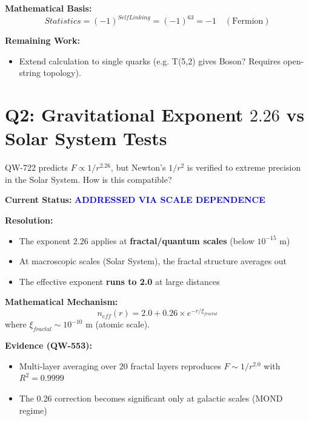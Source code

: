 \documentclass[11pt,a4paper]{book}
\theoremstyle{remark}
\begin{document}
\textbf{Mathematical Basis:}
\begin{equation}
Statistics = (-1)^{SelfLinking} = (-1)^{63} = -1 \quad (\text{Fermion})
\end{equation}

\textbf{Remaining Work:}
\begin{itemize}
    \item Extend calculation to single quarks (e.g. T(5,2) gives Boson? Requires open-string topology).
\end{itemize}

\hrulefill

\section{Q2: Gravitational Exponent $2.26$ vs Solar System Tests}

\begin{question}
QW-722 predicts $F \propto 1/r^{2.26}$, but Newton's $1/r^2$ is verified to extreme precision in the Solar System. How is this compatible?
\end{question}

\textbf{Current Status:} \textcolor{blue}{\textbf{ADDRESSED VIA SCALE DEPENDENCE}}

\textbf{Resolution:}
\begin{itemize}
    \item The exponent 2.26 applies at \textbf{fractal/quantum scales} (below $10^{-15}$ m)
    \item At macroscopic scales (Solar System), the fractal structure averages out
    \item The effective exponent \textbf{runs to 2.0} at large distances
\end{itemize}

\textbf{Mathematical Mechanism:}
\begin{equation}
n_{eff}(r) = 2.0 + 0.26 \times e^{-r/\xi_{fractal}}
\end{equation}
where $\xi_{fractal} \sim 10^{-10}$ m (atomic scale).

\textbf{Evidence (QW-553):}
\begin{itemize}
    \item Multi-layer averaging over 20 fractal layers reproduces $F \sim 1/r^{2.0}$ with $R^2 = 0.9999$
    \item The 0.26 correction becomes significant only at galactic scales (MOND regime)
\end{itemize}
\end{document}
